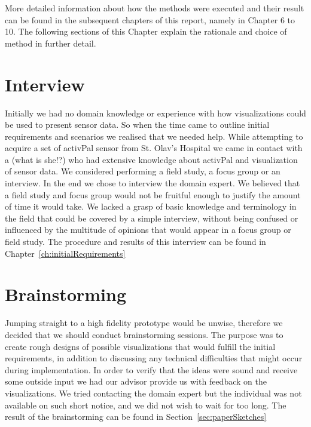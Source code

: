  More detailed information about how the methods were executed and their result can be found in the subsequent chapters of this report, namely in Chapter 6 to 10. The following sections of this Chapter explain the rationale and choice of method in further detail.
 
\section{Interview}
 Initially we had no domain knowledge or experience with how visualizations could be used to present sensor data. So when the time came to outline initial requirements and scenarios we realised that we needed help. While attempting to acquire a set of activPal sensor from St. Olav's Hospital we came in contact with a (what is she!?) who had extensive knowledge about activPal and visualization of sensor data. We considered performing a field study, a focus group or an interview. In the end we chose to interview the domain expert. We believed that a field study and focus group would not be fruitful enough to justify the amount of time it would take. We lacked a grasp of basic knowledge and terminology in the field that could be covered by a simple interview, without being confused or influenced by the multitude of opinions that would appear in a focus group or field study. The procedure and results of this interview can be found in Chapter~\ref{ch:initialRequirements} 
 
\section{Brainstorming}
Jumping straight to a high fidelity prototype would be unwise, therefore we decided that we should conduct brainstorming sessions. The purpose was to create rough designs of possible visualizations that would fulfill the initial requirements, in addition to discussing any technical difficulties that might occur during implementation. In order to verify that the ideas were sound and receive some outside input we had our advisor provide us with feedback on the visualizations. We tried contacting the domain expert but the individual was not available on such short notice, and we did not wish to wait for too long. The result of the brainstorming can be found in Section~\ref{sec:paperSketches}

